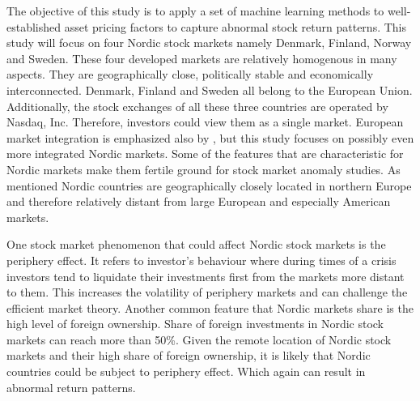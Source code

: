 \documentclass[12pt]{article}
\begin{document}
The objective of this study is to apply a set of machine learning methods to well-established asset pricing factors to capture abnormal stock return patterns. This study will focus on four Nordic stock markets namely Denmark, Finland, Norway and Sweden. These four developed markets are relatively homogenous in many aspects. They are geographically close, politically stable and economically interconnected. Denmark, Finland and Sweden all belong to the European Union. Additionally, the stock exchanges of all these three countries are operated by Nasdaq, Inc. Therefore, investors could view them as a single market. European market integration is emphasized also by \citeauthor{FAMA2012457}, but this study focuses on possibly even more integrated Nordic markets.\footnotemark {} Some of the features that are characteristic for Nordic markets make them fertile ground for stock market anomaly studies. As mentioned Nordic countries are geographically closely located in northern Europe and therefore relatively distant from large European and especially American markets.  \par

One stock market phenomenon that could affect Nordic stock markets is the periphery effect.\footnotemark {} It refers to investor's behaviour where during times of a crisis investors tend to liquidate their investments first from the markets more distant to them. This increases the volatility of periphery markets and can challenge the efficient market theory. Another common feature that Nordic markets share is the high level of foreign ownership. Share of foreign investments in Nordic stock markets can reach more than 50\%\footnotemark. Given the remote location of Nordic stock markets and their high share of foreign ownership, it is likely that Nordic countries could be subject to periphery effect. Which again can result in abnormal return patterns. \par

\end{document}
